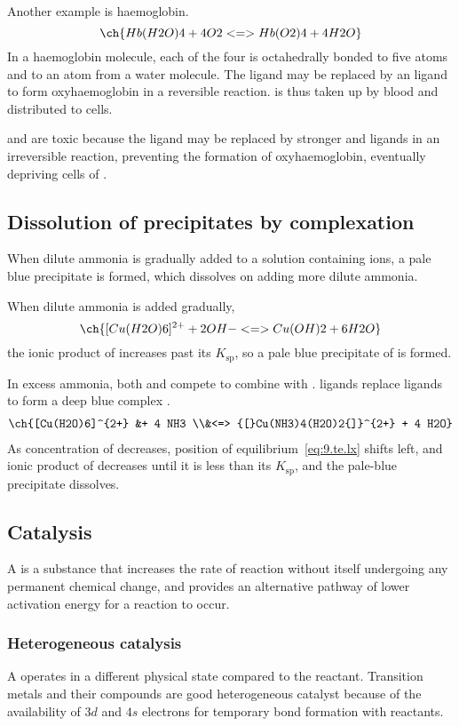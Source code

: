 \documentclass[Chemistry.tex]{subfiles}
\begin{document}
Another example is haemoglobin. \[\ch{Hb(H2O)4 + 4 O2 <=> Hb(O2)4 + 4 H2O}\] In a haemoglobin molecule, each of the four  is octahedrally bonded to five  atoms and to an  atom from a water molecule. The  ligand may be replaced by an  ligand to form oxyhaemoglobin in a reversible reaction.  is thus taken up by blood and distributed to cells.

 and  are toxic because the  ligand may be replaced by stronger  and  ligands in an irreversible reaction, preventing the formation of oxyhaemoglobin, eventually depriving cells of .
\subsection{Dissolution of precipitates by complexation}
When dilute ammonia is gradually added to a solution containing  ions, a pale blue precipitate is formed, which dissolves on adding more dilute ammonia.

When dilute ammonia is added gradually, \begin{equation}\label{eq:9.te.lx}\ch{[Cu(H2O)6]^{2+} + 2 OH- <=> Cu(OH)2 + 6 H2O}\end{equation} the ionic product of  increases past its \(K_\text{sp}\), so a pale blue precipitate of  is formed.

In excess ammonia, both  and  compete to combine with .  ligands replace  ligands to form a deep blue complex
. \[\begin{split}\ch{[Cu(H2O)6]^{2+} &+ 4 NH3 \\&<=> {[}Cu(NH3)4(H2O)2{]}^{2+} + 4 H2O}\end{split}\] As concentration of  decreases, position of equilibrium~\eqref{eq:9.te.lx} shifts left, and ionic product of  decreases until it is less than its \(K_\text{sp}\), and the pale-blue precipitate dissolves.
\subsection{Catalysis}
A  is a substance that increases the rate of reaction without itself undergoing any permanent chemical change, and provides an alternative pathway of lower activation energy for a reaction to occur.
\subsubsection{Heterogeneous catalysis}
A  operates in a different physical state compared to the reactant. Transition metals and their compounds are good heterogeneous catalyst because of the availability of \(3d\) and \(4s\) electrons for temporary bond formation with reactants.
\end{document}
